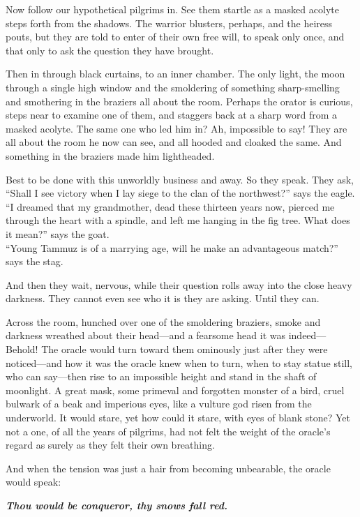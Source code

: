 Now follow our hypothetical pilgrims in. See them startle as a masked acolyte steps forth from the shadows. The warrior blusters, perhaps, and the heiress pouts, but they are told to enter of their own free will, to speak only once, and that only to ask the question they have brought.

Then in through black curtains, to an inner chamber. The only light, the moon through a single high window and the smoldering of something sharp-smelling and smothering in the braziers all about the room. Perhaps the orator is curious, steps near to examine one of them, and staggers back at a sharp word from a masked acolyte. The same one who led him in? Ah, impossible to say! They are all about the room he now can see, and all hooded and cloaked the same. And something in the braziers made him lightheaded.

Best to be done with this unworldly business and away. So they speak. They ask,\\
``Shall I see victory when I lay siege to the clan of the northwest?'' says the eagle.\\
``I dreamed that my grandmother, dead these thirteen years now, pierced me through the heart with a spindle, and left me hanging in the fig tree. What does it mean?'' says the goat.\\
``Young Tammuz is of a marrying age, will he make an advantageous match?'' says the stag.

And then they wait, nervous, while their question rolls away into the close heavy darkness. They cannot even see who it is they are asking. Until they can.

Across the room, hunched over one of the smoldering braziers, smoke and darkness wreathed about their head---and a fearsome head it was indeed---Behold! The oracle would turn toward them ominously just after they were noticed---and how it was the oracle knew when to turn, when to stay statue still, who can say---then rise to an impossible height and stand in the shaft of moonlight. A great mask, some primeval and forgotten monster of a bird, cruel bulwark of a beak and imperious eyes, like a vulture god risen from the underworld. It would stare, yet how could it stare, with eyes of blank stone? Yet not a one, of all the years of pilgrims, had not felt the weight of the oracle's regard as surely as they felt their own breathing.

And when the tension was just a hair from becoming unbearable, the oracle would speak:

\emph{\textbf{Thou would be conqueror, thy snows fall red.}}

